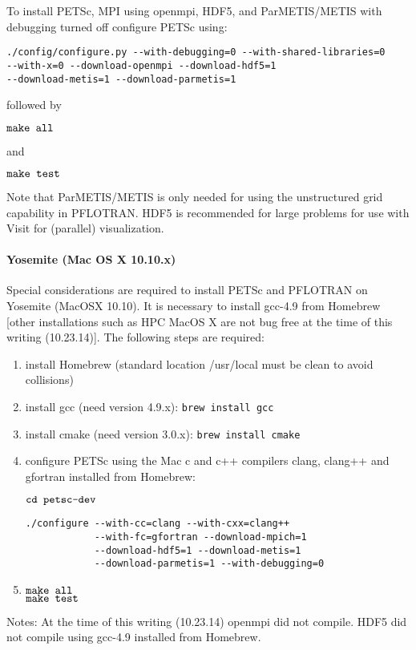 To install PETSc, MPI using openmpi, HDF5, and ParMETIS/METIS with debugging turned off configure PETSc using:

\begin{verbatim}
./config/configure.py --with-debugging=0 --with-shared-libraries=0 
--with-x=0 --download-openmpi --download-hdf5=1 
--download-metis=1 --download-parmetis=1
\end{verbatim}

\noindent
followed by

$\verb|make all|$

\noindent
and

$\verb|make test|$

Note that ParMETIS/METIS is only needed for using the unstructured grid capability in PFLOTRAN. HDF5 is recommended for large problems for use with Visit for (parallel) visualization.

\paragraph{Yosemite (Mac OS X 10.10.x)} Special considerations are required to install PETSc and PFLOTRAN on Yosemite (MacOSX 10.10). It is necessary to install gcc-4.9 from Homebrew [other installations such as HPC MacOS X are not bug free at the time of this writing (10.23.14)]. The following steps are required:
\begin{enumerate}
\item install Homebrew (standard location /usr/local must be clean to avoid collisions)
\item install gcc (need version 4.9.x): {\tt brew install gcc}
\item install cmake (need version 3.0.x): {\tt brew install cmake}
\item configure PETSc using the Mac c and c++ compilers clang, clang++ and gfortran installed from Homebrew: 

$\verb|cd petsc-dev|$\\
\begin{verbatim}
./configure --with-cc=clang --with-cxx=clang++ 
            --with-fc=gfortran --download-mpich=1 
            --download-hdf5=1 --download-metis=1 
            --download-parmetis=1 --with-debugging=0
\end{verbatim} 

\item $\verb|make all|$\\ $\verb|make test|$
\end{enumerate}
Notes: At the time of this writing (10.23.14) openmpi did not compile. HDF5 did not compile using gcc-4.9 installed from Homebrew.

